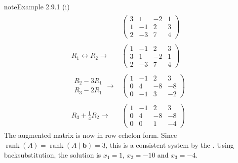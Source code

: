 \documentclass[letterpaper,10pt,english]{jupyterBook}
\begin{document}
\begin{sphinxadmonition}{note}{Example 2.9.1}
\sphinxAtStartPar
(i)  
\begin{equation*}
\begin{split} \begin{align*}
    & \left( \begin{array}{ccc|c}
        3 & 1 & -2 & 1 \\
        1 & -1 & 2 & 3 \\
        2 & -3 & 7 & 4
    \end{array} \right)
    \\ \\
    R_1 \leftrightarrow R_2 \longrightarrow &
    \left( \begin{array}{ccc|c}
        1 & -1 & 2 & 3 \\
        3 & 1 & -2 & 1 \\
        2 & -3 & 7 & 4
    \end{array} \right)
    \\ \\
    \begin{array}{l} R_2 - 3R_1 \\ R_3 - 2R_1 \end{array} \longrightarrow &
    \left( \begin{array}{ccc|c}
        1 & -1 & 2 & 3 \\
        0 & 4 & -8 & -8 \\
        0 & -1 & 3 & -2
    \end{array} \right)
    \\ \\
    R_3 + \frac{1}{4}R_2 \longrightarrow &
    \left( \begin{array}{ccc|c}
        1 & -1 & 2 & 3 \\
        0 & 4 & -8 & -8 \\
        0 & 0 & 1 & -4
    \end{array} \right)
\end{align*} \end{split}
\end{equation*}
\sphinxAtStartPar
The augmented matrix is now in row echelon form. Since \(\operatorname{rank}(A) = \operatorname{rank}(A \mid \mathbf{b}) = 3\), this is a consistent system by the {\hyperref[\detokenize{_pages/2.6_Consistent_systems:consistent-system-theorem}]{}}. Using back\sphinxhyphen{}substitution, the solution is \(x_1 = 1\), \(x_2 = -10\) and \(x_3 = -4\).


\end{sphinxadmonition}
\end{document}
